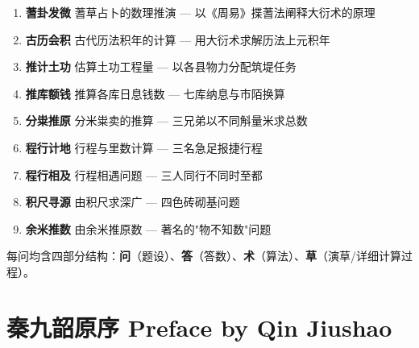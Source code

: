 \documentclass[11pt,a4paper]{article}
\newcommand{\zhtext}[1]{{\chinese #1}}
\begin{document}
\begin{enumerate}[label=\arabic*.]
  \item \textbf{\zhtext{蓍卦发微}} 蓍草占卜的数理推演 — 以《周易》揲蓍法阐释大衍术的原理
  \item \textbf{\zhtext{古历会积}} 古代历法积年的计算 — 用大衍术求解历法上元积年
  \item \textbf{\zhtext{推计土功}} 估算土功工程量 — 以各县物力分配筑堤任务
  \item \textbf{\zhtext{推库额钱}} 推算各库日息钱数 — 七库纳息与市陌换算
  \item \textbf{\zhtext{分粜推原}} 分米粜卖的推算 — 三兄弟以不同斛量米求总数
  \item \textbf{\zhtext{程行计地}} 行程与里数计算 — 三名急足报捷行程
  \item \textbf{\zhtext{程行相及}} 行程相遇问题 — 三人同行不同时至都
  \item \textbf{\zhtext{积尺寻源}} 由积尺求深广 — 四色砖砌基问题
  \item \textbf{\zhtext{余米推数}} 由余米推原数 — 著名的"物不知数"问题
\end{enumerate}

每问均含四部分结构：\textbf{问}（题设）、\textbf{答}（答数）、\textbf{术}（算法）、\textbf{草}（演草/详细计算过程）。

\newpage

\section{\zhtext{秦九韶原序} Preface by Qin Jiushao}
\end{document}
